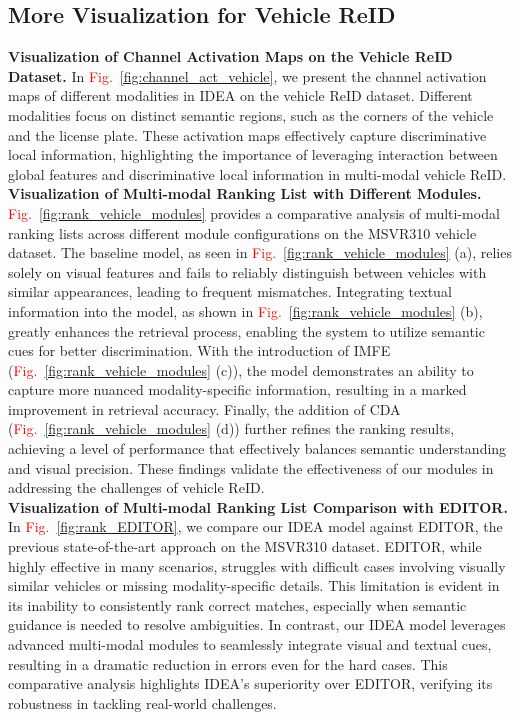 \subsection{More Visualization for Vehicle ReID}
\textbf{Visualization of Channel Activation Maps on the Vehicle ReID Dataset.}
In \textcolor{red}{Fig.}~\ref{fig:channel_act_vehicle}, we present the channel activation maps of different modalities in IDEA on the vehicle ReID dataset.
%
Different modalities focus on distinct semantic regions, such as the corners of the vehicle and the license plate.
%
These activation maps effectively capture discriminative local information, highlighting the importance of leveraging interaction between global features and discriminative local information in multi-modal vehicle ReID.
\\
\textbf{Visualization of Multi-modal Ranking List with Different Modules.}
\textcolor{red}{Fig.}~\ref{fig:rank_vehicle_modules} provides a comparative analysis of multi-modal ranking lists across different module configurations on the MSVR310 vehicle dataset.
%
The baseline model, as seen in \textcolor{red}{Fig.}~\ref{fig:rank_vehicle_modules} (a), relies solely on visual features and fails to reliably distinguish between vehicles with similar appearances, leading to frequent mismatches.
%
Integrating textual information into the model, as shown in \textcolor{red}{Fig.}~\ref{fig:rank_vehicle_modules} (b), greatly enhances the retrieval process, enabling the system to utilize semantic cues for better discrimination.
%
With the introduction of IMFE (\textcolor{red}{Fig.}~\ref{fig:rank_vehicle_modules} (c)), the model demonstrates an ability to capture more nuanced modality-specific information, resulting in a marked improvement in retrieval accuracy.
%
Finally, the addition of CDA (\textcolor{red}{Fig.}~\ref{fig:rank_vehicle_modules} (d)) further refines the ranking results, achieving a level of performance that effectively balances semantic understanding and visual precision.
%
These findings validate the effectiveness of our modules in addressing the challenges of vehicle ReID.
\\
\textbf{Visualization of Multi-modal Ranking List Comparison with EDITOR.}
In \textcolor{red}{Fig.}~\ref{fig:rank_EDITOR}, we compare our IDEA model against EDITOR, the previous state-of-the-art approach on the MSVR310 dataset.
%
EDITOR, while highly effective in many scenarios, struggles with difficult cases involving visually similar vehicles or missing modality-specific details.
%
This limitation is evident in its inability to consistently rank correct matches, especially when semantic guidance is needed to resolve ambiguities.
%
In contrast, our IDEA model leverages advanced multi-modal modules to seamlessly integrate visual and textual cues, resulting in a dramatic reduction in errors even for the hard cases.
%
This comparative analysis highlights IDEA's superiority over EDITOR, verifying its robustness in tackling real-world challenges.
